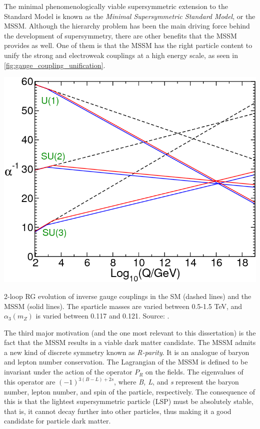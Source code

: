 The minimal phenomenologically viable supersymmetric extension to the Standard Model is known as the \emph{Minimal Supersymmetric Standard Model}, or the MSSM. Although the hierarchy problem has been the main driving force behind the development of supersymmetry, there are other benefits that the MSSM provides as well.
One of them is that the MSSM has the right particle content to unify the strong and electroweak couplings at a high energy scale, as seen in \autoref{fig:gauge_coupling_unification}.

\begin{marginfigure}[-6.5in]
    \includegraphics[width=\textwidth]{images/gauge_coupling_unification}
  \caption{2-loop RG evolution of inverse gauge couplings in the SM (dashed lines) and the MSSM (solid lines). The sparticle masses are varied between 0.5-1.5 TeV, and $\alpha_3(m_Z)$ is varied between 0.117 and 0.121. Source: \citep{Martin1997}.}
  \label{fig:gauge_coupling_unification}
\end{marginfigure}

The third major motivation (and the one most relevant to this dissertation) is the fact that the MSSM results in a viable dark matter candidate. The MSSM admits a new kind of discrete symmetry known as \emph{R-parity}. It is an analogue of baryon and lepton number conservation. The Lagrangian of the MSSM is defined to be invariant under the action of the operator $P_R$ on the fields. The eigenvalues of this operator are $(-1)^{3(B-L)+2s}$, where \emph{B, L}, and \emph{s} represent the baryon number, lepton number, and spin of the particle, respectively. The consequence of this is that the lightest supersymmetric particle (LSP) must be absolutely stable, that is, it cannot decay further into other particles, thus making it a good candidate for particle dark matter.

